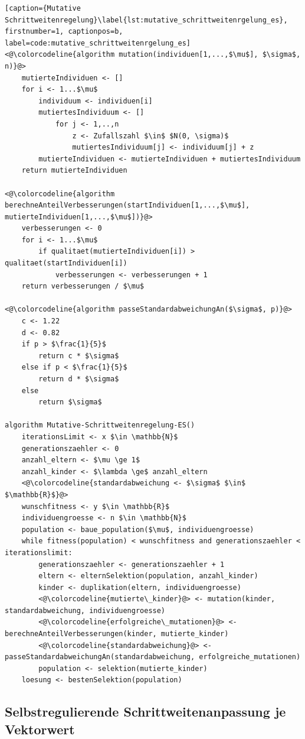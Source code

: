 \begin{lstlisting}[caption={Mutative Schrittweitenregelung}\label{lst:mutative_schrittweitenrgelung_es}, firstnumber=1, captionpos=b, label=code:mutative_schrittweitenrgelung_es]
<@\colorcodeline{algorithm mutation(individuen[1,...,$\mu$], $\sigma$, n)}@>
	mutierteIndividuen <- []
	for i <- 1...$\mu$
		individuum <- individuen[i]
		mutiertesIndividuum <- []		
			for j <- 1,..,n
				z <- Zufallszahl $\in$ $N(0, \sigma)$
				mutiertesIndividuum[j] <- individuum[j] + z
		mutierteIndividuen <- mutierteIndividuen + mutiertesIndividuum
	return mutierteIndividuen
	
<@\colorcodeline{algorithm berechneAnteilVerbesserungen(startIndividuen[1,...,$\mu$], mutierteIndividuen[1,...,$\mu$])}@>
	verbesserungen <- 0	
	for i <- 1...$\mu$
		if qualitaet(mutierteIndividuen[i]) > qualitaet(startIndividuen[i])
			verbesserungen <- verbesserungen + 1
	return verbesserungen / $\mu$
	
<@\colorcodeline{algorithm passeStandardabweichungAn($\sigma$, p)}@>
	c <- 1.22
	d <- 0.82
	if p > $\frac{1}{5}$
		return c * $\sigma$
	else if p < $\frac{1}{5}$
		return d * $\sigma$
	else
		return $\sigma$

algorithm Mutative-Schrittweitenregelung-ES()
	iterationsLimit <- x $\in \mathbb{N}$
	generationszaehler <- 0
	anzahl_eltern <- $\mu \ge 1$
	anzahl_kinder <- $\lambda \ge$ anzahl_eltern
	<@\colorcodeline{standardabweichung <- $\sigma$ $\in$ $\mathbb{R}$}@>
	wunschfitness <- y $\in \mathbb{R}$
	individuengroesse <- n $\in \mathbb{N}$
	population <- baue_population($\mu$, individuengroesse)
	while fitness(population) < wunschfitness and generationszaehler < iterationslimit:
		generationszaehler <- generationszaehler + 1
		eltern <- elternSelektion(population, anzahl_kinder)
		kinder <- duplikation(eltern, individuengroesse)
		<@\colorcodeline{mutierte\_kinder}@> <- mutation(kinder, standardabweichung, individuengroesse)
		<@\colorcodeline{erfolgreiche\_mutationen}@> <- berechneAnteilVerbesserungen(kinder, mutierte_kinder)
		<@\colorcodeline{standardabweichung}@> <- passeStandardabweichungAn(standardabweichung, erfolgreiche_mutationen)
		population <- selektion(mutierte_kinder)
	loesung <- bestenSelektion(population)
\end{lstlisting}

\subsection{Selbstregulierende Schrittweitenanpassung je Vektorwert}


